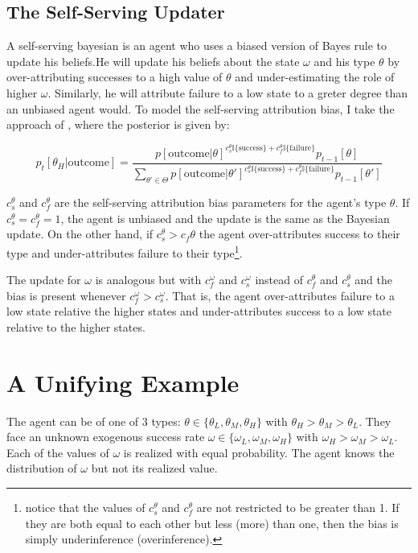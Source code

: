 \documentclass[
  12pt,
]{article}
\begin{document}
\hypertarget{the-self-serving-updater}{%
\subsection{The Self-Serving Updater}\label{the-self-serving-updater}}

A self-serving bayesian is an agent who uses a biased version of Bayes
rule to update his beliefs.He will update his beliefs about the state
\(\omega\) and his type \(\theta\) by over-attributing successes to a
high value of \(\theta\) and under-estimating the role of higher
\(\omega\). Similarly, he will attribute failure to a low state to a
greter degree than an unbiased agent would. To model the self-serving
attribution bias, I take the approach of \citet{benjamin2019}, where the
posterior is given by:

\[
p_{t}[\theta_H|\text{outcome}] = 
\frac{p[\text{outcome}|\theta]^{c_s^{\theta}\mathbb{I}\{\text{success}\}+c_f^{\theta}\mathbb{I}\{\text{failure}\}}p_{t-1}[\theta]}
{\sum_{\theta'\in\Theta}p[\text{outcome}|\theta']^{c_s^{\theta}\mathbb{I}\{\text{success}\}+c_f^{\theta}\mathbb{I}\{\text{failure}\}}p_{t-1}[\theta']}
\]

\(c_s^{\theta}\) and \(c_f^{\theta}\) are the self-serving attribution
bias parameters for the agent's type \(\theta\). If
\(c_s^{\theta} = c_f^{\theta} = 1\), the agent is unbiased and the
update is the same as the Bayesian update. On the other hand, if
\(c_s^{\theta} > c_f{\theta}\) the agent over-attributes success to
their type and under-attributes failure to their type\footnote{
  notice that the values of $c_s^{\theta}$ and $c_f^{\theta}$ are not restricted to be greater than 1. If they are both equal to 
  each other but less (more) than one, then the bias is simply underinference (overinference).}.

The update for \(\omega\) is analogous but with \(c_f^{\omega}\) and
\(c_s^{\omega}\) instead of \(c_f^{\theta}\) and \(c_s^{\theta}\) and
the bias is present whenever \(c_f^{\omega} > c_s^{\omega}\). That is,
the agent over-attributes failure to a low state relative the higher
states and under-attributes success to a low state relative to the
higher states.

\hypertarget{a-unifying-example}{%
\section{A Unifying Example}\label{a-unifying-example}}

The agent can be of one of 3 types:
\(\theta \in \{\theta_L, \theta_M, \theta_H\}\) with
\(\theta_H > \theta_M > \theta_L\). They face an unknown exogenous
success rate \(\omega \in \{\omega_L, \omega_M, \omega_H\}\) with
\(\omega_H>\omega_M>\omega_L\). Each of the values of \(\omega\) is
realized with equal probability. The agent knows the distribution of
\(\omega\) but not its realized value.
\end{document}
